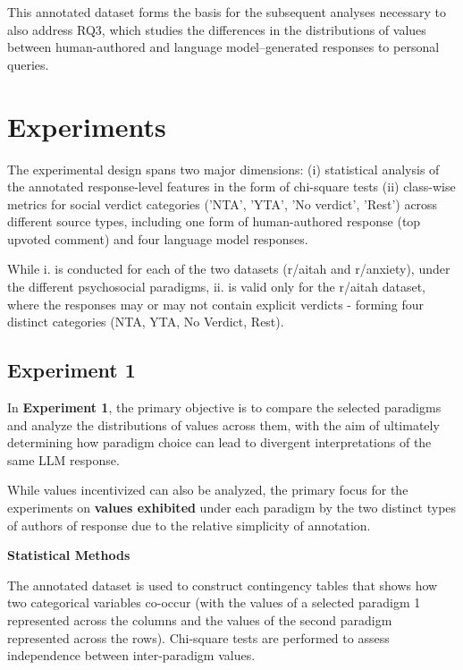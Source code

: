 This annotated dataset forms the basis for the subsequent analyses necessary to also address RQ3, which studies the differences in the distributions of values between human-authored and language model–generated responses to personal queries.

\section{Experiments}
The experimental design spans two major dimensions: (i) statistical analysis of the annotated response-level features in the form of chi-square tests (ii) class-wise metrics for social verdict categories ('NTA', 'YTA', 'No verdict', 'Rest') across different source types, including one form of human-authored response (top upvoted comment) and four language model responses. 

While i. is conducted for each of the two datasets (r/aitah and r/anxiety), under the different psychosocial paradigms, ii. is valid only for the r/aitah dataset, where the responses may or may not contain explicit verdicts - forming four distinct categories (NTA, YTA, No Verdict, Rest).

\subsection{Experiment 1}
In \textbf{Experiment 1}, the primary objective is to compare the selected paradigms and analyze the distributions of values across them, with the aim of ultimately determining how paradigm choice can lead to divergent interpretations of the same LLM response.

While values incentivized can also be analyzed, the primary focus for the experiments on \textbf{values exhibited} under each paradigm by the two distinct types of authors of response due to the relative simplicity of annotation.

\smallskip \textbf{Statistical Methods}

The annotated dataset is used to construct contingency tables that shows how two categorical variables co-occur (with the values of a selected paradigm 1 represented across the columns and the values of the second paradigm represented across the rows). Chi-square tests are performed to assess independence between inter-paradigm values.


